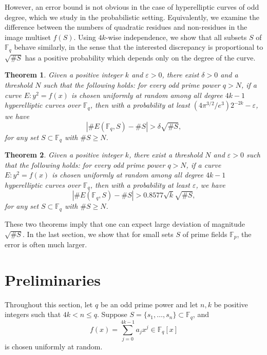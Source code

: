 \documentclass{amsart}
\theoremstyle{plain}
\newtheorem{theorem}{Theorem}
\theoremstyle{definition}
\newcommand{\eps}{\varepsilon}
\newcommand{\Fp}{\mathbb{F}_p}
\newcommand{\Fq}{\mathbb{F}_q}
\begin{document}
However, an error bound is not obvious in the case of hyperelliptic curves of odd degree, which we study in the probabilistic setting. Equivalently, we examine the difference between the numbers of quadratic residues and non-residues in the image multiset $f(S)$. Using $4k$-wise independence, we show that all subsets $S$ of $\Fq$ behave similarly, in the sense that the interested discrepancy is proportional to $\sqrt{\#S}$ has a positive probability which depends only on the degree of the curve.

\begin{theorem}
\label{thm:largeProb}
Given a positive integer $k$ and $\eps>0$, there exist $\delta>0$ and a threshold $N$ such that the following holds: for every odd prime power $q>N$, if a curve $E:y^2=f(x)$ is chosen uniformly at random among all degree $4k-1$ hyperelliptic curves over $\Fq$, then with a probability at least $(4\pi^{3/2}/e^3)2^{-2k}-\eps$, we have
\[
|\#E(\Fq,S)-\#S|>\delta\sqrt{\#S},
\]
for any set $S\subset\Fq$ with $\#S\geq{N}$.
\end{theorem}

\begin{theorem}
\label{thm:smallProb}
Given a positive integer $k$, there exist a threshold $N$ and $\eps>0$ such that the following holds: for every odd prime power $q>N$, if a curve $E:y^2=f(x)$ is chosen uniformly at random among all degree $4k-1$ hyperelliptic curves over $\Fq$, then with a probability at least $\eps$, we have
\[
|\#E(\Fq,S)-\#S|>0.8577\sqrt{k}\sqrt{\#S},
\]
for any set $S\subset\Fq$ with $\#S\geq{N}$.
\end{theorem}

These two theorems imply that one can expect large deviation of magnitude $\sqrt{\#S}$. In the last section, we show that for small sets $S$ of prime fields $\Fp$, the error is often much larger.

\section{Preliminaries}
\label{sec:ellipticPreliminaries}
Throughout this section, let $q$ be an odd prime power and let $n,k$ be positive integers such that $4k<n\leq{q}$. Suppose $S=\{s_1,\ldots,s_n\}\subset\Fq$, and
\[
f(x)=\sum_{j=0}^{4k-1}a_{j}x^{j}\in\Fq[x]
\]
is chosen uniformly at random. 
\end{document}
